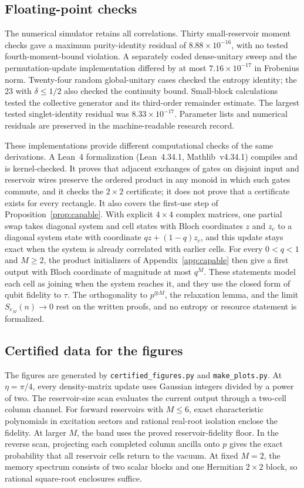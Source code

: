 \subsection{Floating-point checks}

The numerical simulator retains all correlations. Thirty small-reservoir moment checks gave a maximum purity-identity residual of $8.88\times10^{-16}$, with no tested fourth-moment-bound violation. A separately coded dense-unitary sweep and the permutation-update implementation differed by at most $7.16\times10^{-17}$ in Frobenius norm. Twenty-four random global-unitary cases checked the entropy identity; the 23 with $\delta\le1/2$ also checked the continuity bound. Small-block calculations tested the collective generator and its third-order remainder estimate. The largest tested singlet-identity residual was $8.33\times10^{-17}$. Parameter lists and numerical residuals are preserved in the machine-readable research record.

These implementations provide different computational checks of the same derivations. A Lean~4 formalization (Lean~4.34.1, Mathlib~v4.34.1) compiles and is kernel-checked. It proves that adjacent exchanges of gates on disjoint input and reservoir wires preserve the ordered product in any monoid in which such gates commute, and it checks the $2\times2$ certificate; it does not prove that a certificate exists for every rectangle. It also covers the first-use step of Proposition~\ref{prop:capable}. With explicit $4\times4$ complex matrices, one partial swap takes diagonal system and cell states with Bloch coordinates $z$ and $z_c$ to a diagonal system state with coordinate $qz+(1-q)z_c$, and this update stays exact when the system is already correlated with earlier cells. For every $0<q<1$ and $M\ge2$, the product initializers of Appendix~\ref{app:capable} then give a first output with Bloch coordinate of magnitude at most $q^M$. These statements model each cell as joining when the system reaches it, and they use the closed form of qubit fidelity to $\tau$. The orthogonality to $p^{\otimes M}$, the relaxation lemma, and the limit $S_{e_M}(n)\to0$ rest on the written proofs, and no entropy or resource statement is formalized.

\subsection{Certified data for the figures}
The figures are generated by \texttt{certified\_figures.py} and \texttt{make\_plots.py}. At $\eta=\pi/4$, every density-matrix update uses Gaussian integers divided by a power of two. The reservoir-size scan evaluates the current output through a two-cell column channel. For forward reservoirs with $M\le6$, exact characteristic polynomials in excitation sectors and rational real-root isolation enclose the fidelity. At larger $M$, the band uses the proved reservoir-fidelity floor. In the reverse scan, projecting each completed column ancilla onto $p$ gives the exact probability that all reservoir cells return to the vacuum. At fixed $M=2$, the memory spectrum consists of two scalar blocks and one Hermitian $2\times2$ block, so rational square-root enclosures suffice.

